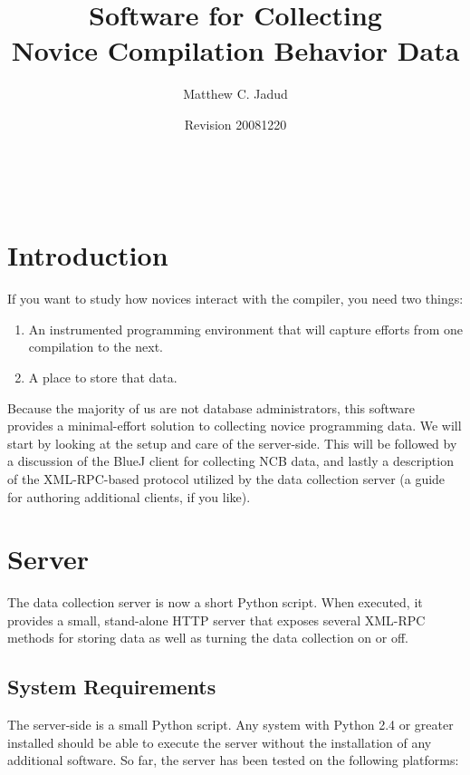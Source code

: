 \documentclass[12pt]{article}
\title{Software for Collecting\\Novice Compilation Behavior Data}
\author{Matthew C. Jadud}
\date{Revision 20081220}
\begin{document}
	\maketitle
	\begin{center}
                \\[2.5ex]
                {\tiny\CcNote{\CcLongnameByNcSa}}
                \vspace*{-2.5ex}
	\end{center}

\section{Introduction}
If you want to study how novices interact with the compiler, you need two things:

\begin{enumerate}
	\item An instrumented programming environment that will capture efforts from one compilation to the next.
	\item A place to store that data.
\end{enumerate}

Because the majority of us are not database administrators, this software provides a minimal-effort solution to collecting novice programming data. We will start by looking at the setup and care of the server-side. This will be followed by a discussion of the BlueJ client for collecting NCB data, and lastly a description of the XML-RPC-based protocol utilized by the data collection server (a guide for authoring additional clients, if you like).

\section{Server}
The data collection server is now a short Python script. When executed, it provides a small, stand-alone HTTP server that exposes several XML-RPC methods for storing data as well as turning the data collection on or off.

\subsection{System Requirements}
The server-side is a small Python script. Any system with Python 2.4 or greater installed should be able to execute the server without the installation of any additional software. So far, the server has been tested on the following platforms:
\end{document}
